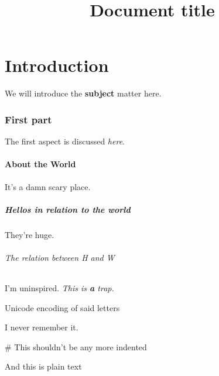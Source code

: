 \documentclass{article}
\begin{document}
\title{Document title}
\author{}
\maketitle

\part{Introduction}

We will introduce the \textbf{subject} matter here.

\section{First part}

The first aspect is discussed \textit{here}.

\subsection{About the World}

It's a damn scary place.

\subsubsection{Hellos in relation to the world}

They're huge.

\paragraph{The relation between H and W}\mbox{}\newline

I'm uninspired. \textit{This is \textbf{a} trap.}

\subparagraph{Unicode encoding of said letters}\mbox{}\newline

I never remember it.

\subparagraph{\# This shouldn't be any more indented}\mbox{}\newline

And this is plain text
\end{document}
